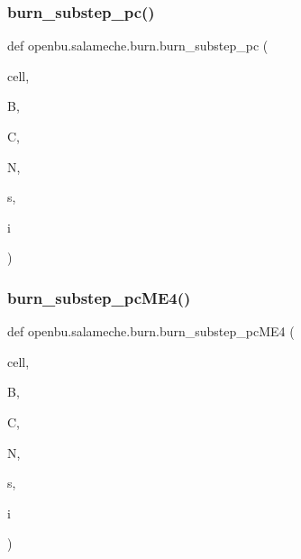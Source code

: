 \subsubsection{\texorpdfstring{burn\+\_\+substep\+\_\+pc()}{burn\_substep\_pc()}}
{\footnotesize\ttfamily def openbu.\+salameche.\+burn.\+burn\+\_\+substep\+\_\+pc (\begin{DoxyParamCaption}\item[{}]{cell,  }\item[{}]{B,  }\item[{}]{C,  }\item[{}]{N,  }\item[{}]{s,  }\item[{}]{i }\end{DoxyParamCaption})}

\mbox{\label{namespaceopenbu_1_1salameche_1_1burn_aadafd1576eba5212c8962c448b7d2959}} 
\subsubsection{\texorpdfstring{burn\+\_\+substep\+\_\+pc\+M\+E4()}{burn\_substep\_pcME4()}}
{\footnotesize\ttfamily def openbu.\+salameche.\+burn.\+burn\+\_\+substep\+\_\+pc\+M\+E4 (\begin{DoxyParamCaption}\item[{}]{cell,  }\item[{}]{B,  }\item[{}]{C,  }\item[{}]{N,  }\item[{}]{s,  }\item[{}]{i }\end{DoxyParamCaption})}

